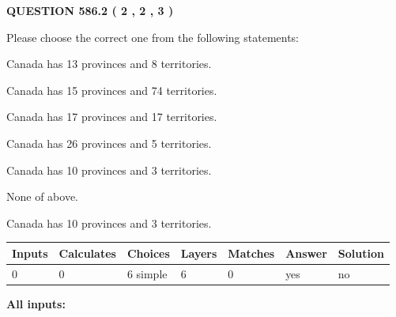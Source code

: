 \documentclass[12pt]{article}
\begin{document}
   
  
\vspace{0.2in}
  
{\textbf{\Large{QUESTION
586.2 
 ( 2 , 2 , 3 )
}}}
  
  
Please choose the correct one from the following statements:
 
 
Canada has  13 provinces and  8 territories.
 
 
Canada has  15 provinces and  74 territories.
 
 
Canada has  17 provinces and  17 territories.
 
 
Canada has  26 provinces and  5 territories.
 
 
Canada has 10  provinces and 3 territories.
 
 
 None of above.
 
 
\noindent{}
 
 
Canada has 10  provinces and 3 territories.
 
 
\noindent{}
 
 
   
   
   
   
\noindent\begin{tabular}{|l|l|l|l|l|l|l|}
 \hline
Inputs & Calculates & Choices & Layers & Matches & Answer & Solution \\ \hline
 0  & 
 0  & 
 6
  simple  
  & 
 6  & 
 0  & 
  yes & 
  no 
  \\ \hline
 \end{tabular}
   
   
   
   
\noindent{}
   
   
   
   
\noindent\vspace{0.1in}\hspace{-0.08in} {\textbf{\Large{All inputs: }}}
   
   
   
   
   
   
 \vspace{0.2in}
 
\end{document}
